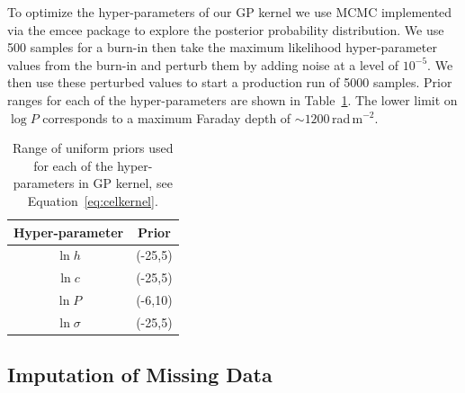 \documentclass[fleqn,usenatbib]{mnras}
\begin{document}
To optimize the hyper-parameters of our GP kernel we use MCMC implemented via the {\sc emcee} package \citep{emcee} to explore the posterior probability distribution. We use 500 samples for a burn-in then take the maximum likelihood hyper-parameter values from the burn-in and perturb them by adding noise at a level of $10^{-5}$. We then use these perturbed values to start a production run of 5000 samples. Prior ranges for each of the hyper-parameters are shown in Table~\ref{tab:priors}. The lower limit on $\log P$ corresponds to a maximum Faraday depth of $\sim1200$\,rad\,m$^{-2}$.
%
\begin{table}
\caption{\label{tab:priors} Range of uniform priors used for each of the hyper-parameters in GP kernel, see Equation~\ref{eq:celkernel}.}
\centering
\begin{tabular}{|c|c|}
\hline
Hyper-parameter & Prior \\\hline
$\ln h$ & (-25,5)\\
$\ln c$ & (-25,5)\\
$\ln P$ & (-6,10)\\
$\ln \sigma$ & (-25,5)\\\hline
\end{tabular}
\end{table}


\subsection{Imputation of Missing Data}
\label{sec:missing}
\end{document}
